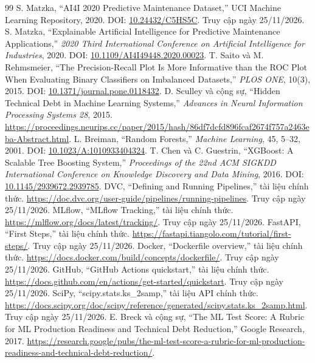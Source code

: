 \begin{thebibliography}{99}
 S. Matzka, ``AI4I 2020 Predictive Maintenance Dataset,'' UCI Machine Learning Repository, 2020. DOI: \href{https://doi.org/10.24432/C5HS5C}{10.24432/C5HS5C}. Truy cập ngày 25/11/2026.
 S. Matzka, ``Explainable Artificial Intelligence for Predictive Maintenance Applications,'' \emph{2020 Third International Conference on Artificial Intelligence for Industries}, 2020. DOI: \href{https://doi.org/10.1109/AI4I49448.2020.00023}{10.1109/AI4I49448.2020.00023}.
 T. Saito và M. Rehmsmeier, ``The Precision-Recall Plot Is More Informative than the ROC Plot When Evaluating Binary Classifiers on Imbalanced Datasets,'' \emph{PLOS ONE}, 10(3), 2015. DOI: \href{https://doi.org/10.1371/journal.pone.0118432}{10.1371/journal.pone.0118432}.
 D. Sculley và cộng sự, ``Hidden Technical Debt in Machine Learning Systems,'' \emph{Advances in Neural Information Processing Systems 28}, 2015. \url{https://proceedings.neurips.cc/paper/2015/hash/86df7dcfd896fcaf2674f757a2463eba-Abstract.html}.
 L. Breiman, ``Random Forests,'' \emph{Machine Learning}, 45, 5--32, 2001. DOI: \href{https://doi.org/10.1023/A:1010933404324}{10.1023/A:1010933404324}.
 T. Chen và C. Guestrin, ``XGBoost: A Scalable Tree Boosting System,'' \emph{Proceedings of the 22nd ACM SIGKDD International Conference on Knowledge Discovery and Data Mining}, 2016. DOI: \href{https://doi.org/10.1145/2939672.2939785}{10.1145/2939672.2939785}.
 DVC, ``Defining and Running Pipelines,'' tài liệu chính thức. \url{https://doc.dvc.org/user-guide/pipelines/running-pipelines}. Truy cập ngày 25/11/2026.
 MLflow, ``MLflow Tracking,'' tài liệu chính thức. \url{https://mlflow.org/docs/latest/tracking/}. Truy cập ngày 25/11/2026.
 FastAPI, ``First Steps,'' tài liệu chính thức. \url{https://fastapi.tiangolo.com/tutorial/first-steps/}. Truy cập ngày 25/11/2026.
 Docker, ``Dockerfile overview,'' tài liệu chính thức. \url{https://docs.docker.com/build/concepts/dockerfile/}. Truy cập ngày 25/11/2026.
 GitHub, ``GitHub Actions quickstart,'' tài liệu chính thức. \url{https://docs.github.com/en/actions/get-started/quickstart}. Truy cập ngày 25/11/2026.
 SciPy, ``scipy.stats.ks\_2samp,'' tài liệu API chính thức. \url{https://docs.scipy.org/doc/scipy/reference/generated/scipy.stats.ks_2samp.html}. Truy cập ngày 25/11/2026.
 E. Breck và cộng sự, ``The ML Test Score: A Rubric for ML Production Readiness and Technical Debt Reduction,'' Google Research, 2017. \url{https://research.google/pubs/the-ml-test-score-a-rubric-for-ml-production-readiness-and-technical-debt-reduction/}.
\end{thebibliography}


